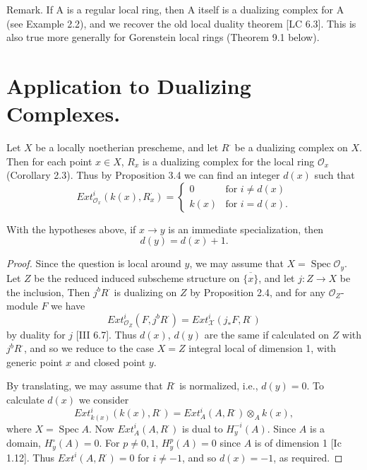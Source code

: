 \documentclass[12pt]{book}
\newcommand{\sheaf}[1]{\mathcal{#1}}
\DeclareMathOperator{\Spec}{Spec}
\begin{document}
\setcounter{page}{281}
Remark. If A is a regular local ring, then A itself is a dualizing complex for A (see Example 2.2), and we recover the old local duality theorem [LC 6.3]. This is also true more generally for Gorenstein local rings (Theorem 9.1 below).

\setcounter{page}{282}
\section{Application to Dualizing Complexes.}
Let \(X\) be a locally noetherian prescheme, and let \(R^{\cdot}\) be a dualizing complex on \(X\). Then for each point \(x \in X\), \(R_{x}\) is a dualizing complex for the local ring \(\sheaf{O}_{x}\) (Corollary 2.3). Thus by Proposition 3.4 we can find an integer \(d(x)\) such that
\[
Ext_{\sheaf{O}_{x}}^{i}\left(k(x), R_{x}^{\cdot}\right)=
\begin{cases}
0 & \text{for } i \neq d(x) \\
k(x) & \text{for } i=d(x) .
\end{cases}
\]

\begin{proposition}
With the hypotheses above, if \(x \to y\) is an immediate specialization, then
\[
d(y)=d(x)+1 .
\]
\end{proposition}

\begin{proof}
Since the question is local around \(y\), we may assume that \(X = \Spec \sheaf{O}_{y}\).
Let \(Z\) be the reduced induced subscheme structure on \(\overline{\{x\}}\), and let \(j: Z \to X\) be the inclusion, Then \(j^{b} R^{\cdot}\) is dualizing on \(Z\) by Proposition 2.4, and for any \(\sheaf{O}_{Z}\)-module \(F\) we have
\[
Ext_{\sheaf{O}_{Z}}^{i}\left(F, j^{b} R^{\cdot}\right)=Ext_{\sheaf{X}}^{i}\left(j_{*} F, R^{\cdot}\right)
\]
by duality for \(j\) [III 6.7]. Thus \(d(x)\), \(d(y)\) are the same if calculated on \(Z\) with \(j^{b} R^{\cdot}\), and so we reduce to the case \(X=Z\) integral local of dimension 1, with generic point \(x\) and closed point \(y\).

\setcounter{page}{283}
By translating, we may assume that \(R^{\cdot}\) is normalized, i.e., \(d(y)=0\).
To calculate \(d(x)\) we consider
\[
Ext_{k(x)}^{i}(k(x), R^{\cdot})=Ext_{A}^{i}(A, R^{\cdot}) \otimes_{A} k(x),
\]
where \(X=\Spec A\). Now \(Ext_{A}^{i}(A, R^{\cdot})\) is dual to \(H_{y}^{-i}(A)\).
Since \(A\) is a domain, \(H_{y}^{\circ}(A)=0\).
For \(p \neq0,1\), \(H_{y}^{p}(A)=0\) since \(A\) is of dimension 1 [Ic 1.12].
Thus \(Ext^{i}(A, R^{\cdot})=0\) for \(i \neq-1\), and so \(d(x)=-1\), as required.
\end{proof}
\end{document}
